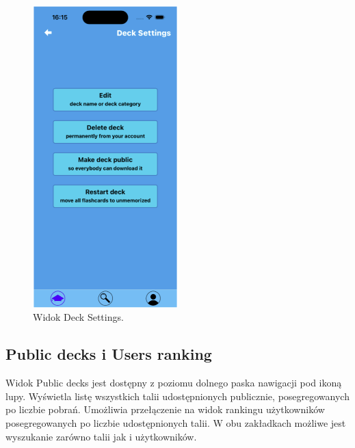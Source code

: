 \begin{figure}[H]
    \centering
    \includegraphics[width=0.5\textwidth]{chapters/chapter_10/images_mobile/mobile_deck_settings}
    \caption{Widok Deck Settings.}
    \label{img:mobile_deck_settings}
\end{figure}


\subsection{Public decks i Users ranking}
Widok Public decks jest dostępny z poziomu dolnego paska nawigacji pod ikoną lupy. Wyświetla listę wszystkich talii udostępnionych publicznie, posegregowanych po liczbie pobrań. Umożliwia przełączenie na widok rankingu użytkowników posegregowanych po liczbie udostępnionych talii. W obu zakładkach możliwe jest wyszukanie zarówno talii jak i użytkowników.


